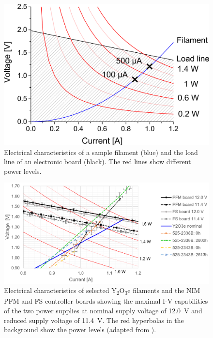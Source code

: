 		\begin{figure}[h]
			\centering
			\includegraphics[width=.7\textwidth]{Bilder/Fil_SampGraph.png}
			\caption{Electrical characteristics of a sample filament (blue) and the load line of an electronic board (black). The red lines show different power levels.}
			\label{fig:FilSampGraph}
		\end{figure}
		\begin{figure}[h]
			\centering
			\includegraphics[width=\textwidth]{Bilder/Filament_RicosGraph.png}
			\caption{Electrical characteristics of selected Y\textsubscript{2}O\textsubscript{3}e filaments and the NIM PFM and FS controller boards showing the maximal I-V capabilities of the two power supplies at nominal supply voltage of 12.0~V and reduced supply voltage of 11.4~V. The red hyperbolas in the background show the power levels (adapted from \cite{Diss_Fausch}).}
			\label{fig:FilRico}
		\end{figure}
		
